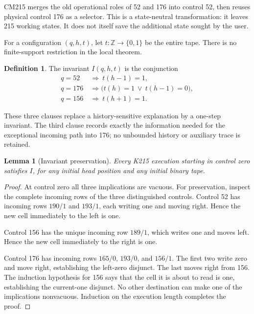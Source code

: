 \documentclass[11pt,letterpaper]{article}
\newtheorem{lemma}[theorem]{Lemma}
\theoremstyle{definition}
\newtheorem{definition}[theorem]{Definition}
\begin{document}
CM215 merges the old operational roles of 52 and 176 into control 52,
then reuses physical control 176 as a selector. This is a state-neutral
transformation: it leaves 215 working states. It does not itself save the
additional state sought by the user.

For a configuration $(q,h,t)$, let $t:\mathbb Z\to\{0,1\}$ be the entire
tape. There is no finite-support restriction in the local theorem.

\begin{definition}
The invariant $I(q,h,t)$ is the conjunction
\begin{align*}
 q=52  &\ \Longrightarrow\ t(h-1)=1,\\
 q=176 &\ \Longrightarrow\bigl(t(h)=1\ \lor\ t(h-1)=0\bigr),\\
 q=156 &\ \Longrightarrow\ t(h+1)=1.
\end{align*}
\end{definition}

These three clauses replace a history-sensitive explanation by a
one-step invariant. The third clause records exactly the information
needed for the exceptional incoming path into 176; no unbounded history
or auxiliary trace is retained.

\begin{lemma}[Invariant preservation]\label{lem:inv}
Every K215 execution starting in control zero satisfies $I$, for any
initial head position and any initial binary tape.
\end{lemma}

\begin{proof}
At control zero all three implications are vacuous. For preservation,
inspect the complete incoming rows of the three distinguished controls.
Control 52 has incoming rows $190/1$ and $193/1$, each writing one and
moving right. Hence the new cell immediately to the left is one.

Control 156 has the unique incoming row $189/1$, which writes one and
moves left. Hence the new cell immediately to the right is one.

Control 176 has incoming rows $165/0$, $193/0$, and $156/1$. The first
two write zero and move right, establishing the left-zero disjunct. The
last moves right from 156. The induction hypothesis for 156 says that
the cell it is about to read is one, establishing the current-one
disjunct. No other destination can make one of the implications
nonvacuous. Induction on the execution length completes the proof.
\end{proof}
\end{document}
